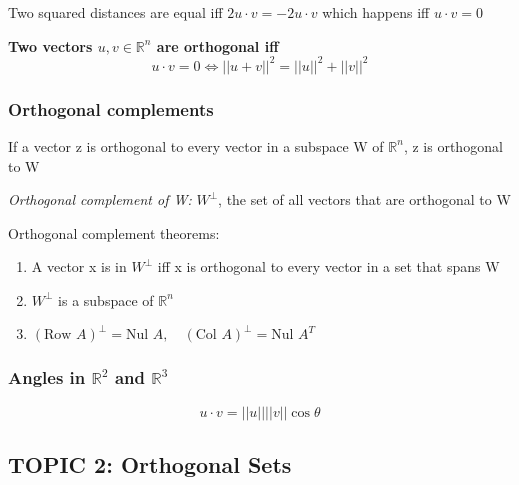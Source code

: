 \documentclass[12pt]{article} %
\newcommand{\R}{\mathbb{R}}
\begin{document}
Two squared distances are equal iff $2 u \cdot v = -2 u \cdot v$ which happens iff $u\cdot v = 0$

\textbf{Two vectors $u, v \in \R^n$ are orthogonal iff $$u \cdot v = 0 \iff ||u + v||^2 = ||u||^2 + ||v||^2$$}

\subsubsection{Orthogonal complements}
If a vector z is orthogonal to every vector in a subspace W of $\R^n$, z is orthogonal to W

\emph{Orthogonal complement of W:} $W^\perp$, the set of all vectors that are orthogonal to W

Orthogonal complement theorems:
\begin{enumerate}
	\item A vector x is in $W^\perp$ iff x is orthogonal to every vector in a set that spans W
	\item $W^\perp$ is a subspace of $\R^n$
	\item $(\text{Row }A)^\perp = \text{Nul }A, \quad (\text{Col } A)^\perp = \text{Nul }A^T$
\end{enumerate}

\subsubsection{Angles in $\R^2$ and $\R^3$}
$$u\cdot v = ||u|| ||v|| \cos\theta$$

\subsection{TOPIC 2: Orthogonal Sets}
\end{document}
